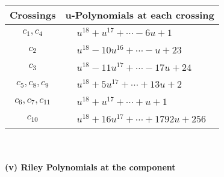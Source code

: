 \documentclass[1p]{elsarticle_modified}
\theoremstyle{definition}
\begin{document}
\begin{tabular}{m{50pt}|m{274pt}}
Crossings & \hspace{64pt}u-Polynomials at each crossing \\
\hline $$\begin{aligned}c_{1},c_{4}\end{aligned}$$&$\begin{aligned}
&u^{18}+u^{17}+\cdots-6 u+1
\end{aligned}$\\
\hline $$\begin{aligned}c_{2}\end{aligned}$$&$\begin{aligned}
&u^{18}-10 u^{16}+\cdots- u+23
\end{aligned}$\\
\hline $$\begin{aligned}c_{3}\end{aligned}$$&$\begin{aligned}
&u^{18}-11 u^{17}+\cdots-17 u+24
\end{aligned}$\\
\hline $$\begin{aligned}c_{5},c_{8},c_{9}\end{aligned}$$&$\begin{aligned}
&u^{18}+5 u^{17}+\cdots+13 u+2
\end{aligned}$\\
\hline $$\begin{aligned}c_{6},c_{7},c_{11}\end{aligned}$$&$\begin{aligned}
&u^{18}+u^{17}+\cdots+u+1
\end{aligned}$\\
\hline $$\begin{aligned}c_{10}\end{aligned}$$&$\begin{aligned}
&u^{18}+16 u^{17}+\cdots+1792 u+256
\end{aligned}$\\
\hline
\end{tabular}\\~\\
\newpage\renewcommand{\arraystretch}{1}
\flushleft \textbf{(v) Riley Polynomials at the component}\newline \\
\end{document}
